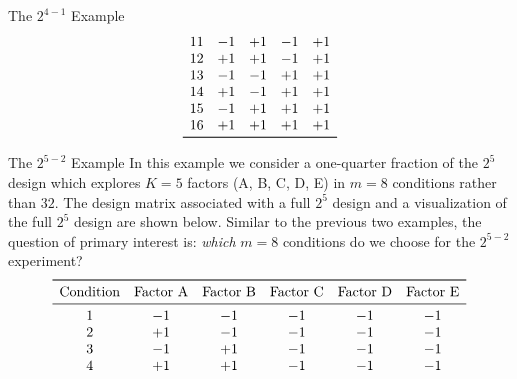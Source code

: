 \begin{itemize}
\begin{Example}{The $ 2^{4-1} $ Example}{}
\[\begin{array}{ccccc}
                      11               & -1              & +1              & -1              & +1              \\
                      12               & +1              & +1              & -1              & +1              \\
                      13               & -1              & -1              & +1              & +1              \\
                      14               & +1              & -1              & +1              & +1              \\
                      15               & -1              & +1              & +1              & +1              \\
                      16               & +1              & +1              & +1              & +1              \\
                      \bottomrule
                  \end{array} \]
          \end{Example}
          \begin{Example}{The $ 2^{5-2} $ Example}{}
              In this example we consider a one-quarter fraction of the $2^5$ design which
              explores $K = 5$ factors (A, B, C, D, E) in $m = 8$ conditions rather than $32$. The design matrix
              associated with a full $2^5$ design and a visualization of the full $2^5$ design are shown below. Similar
              to the previous two examples, the question of primary interest is: \emph{which} $m = 8$ conditions do we
              choose for the $2^{5-2}$ experiment?
              \[ \begin{array}{cccccc}
                      \toprule
                      \text{Condition} & \text{Factor A} & \text{Factor B} & \text{Factor C} & \text{Factor D} & \text{Factor E} \\
                      \midrule
                      1                & -1              & -1              & -1              & -1              & -1              \\
                      2                & +1              & -1              & -1              & -1              & -1              \\
                      3                & -1              & +1              & -1              & -1              & -1              \\
                      4                & +1              & +1              & -1              & -1              & -1              \\

\end{array}\]
\end{Example}
\end{itemize}
